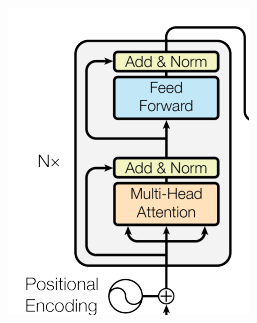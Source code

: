 \documentclass[11pt]{article}
\begin{document}
            \begin{center}
                \includegraphics[scale=0.9]{graph/transformer1.png}
            \end{center}
\end{document}
